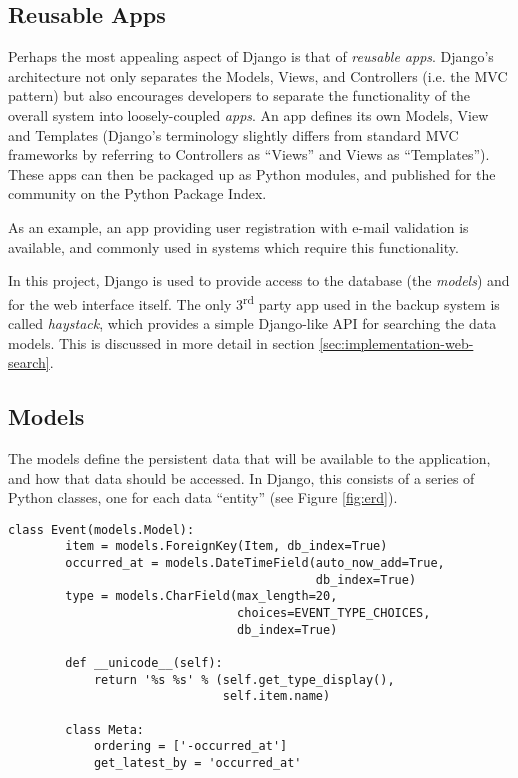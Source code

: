 \subsection{Reusable Apps}

Perhaps the most appealing aspect of Django is that of \emph{reusable apps}.
Django's architecture not only separates the Models, Views, and Controllers
(i.e. the MVC pattern) but also encourages developers to separate the
functionality of the overall system into loosely-coupled \emph{apps}. An app
defines its own Models, View and Templates (Django's terminology slightly
differs from standard MVC frameworks by referring to Controllers as ``Views''
and Views as ``Templates''). These apps can then be packaged up as Python
modules, and published for the community on the Python Package Index.

As an example, an app providing user registration with e-mail validation is
available, and commonly used in systems which require this functionality.

In this project, Django is used to provide access to the database (the
\emph{models}) and for the web interface itself. The only 3\textsuperscript{rd}
party app used in the backup system is called \emph{haystack}, which provides
a simple Django-like API for searching the data models. This is discussed in
more detail in section \ref{sec:implementation-web-search}.

\subsection{Models}
\label{sec:implementation-django-models}

The models define the persistent data that will be available to the
application, and how that data should be accessed. In Django, this consists of
a series of Python classes, one for each data ``entity'' (see Figure
\ref{fig:erd}).

\begin{singlespacing}
\begin{lstlisting}[caption=The `Event' model, label=lst:event-model]
    class Event(models.Model):
        item = models.ForeignKey(Item, db_index=True)
        occurred_at = models.DateTimeField(auto_now_add=True,
                                           db_index=True)
        type = models.CharField(max_length=20,
                                choices=EVENT_TYPE_CHOICES,
                                db_index=True)

        def __unicode__(self):
            return '%s %s' % (self.get_type_display(),
                              self.item.name)

        class Meta:
            ordering = ['-occurred_at']
            get_latest_by = 'occurred_at'
\end{lstlisting}
\end{singlespacing}

